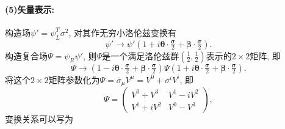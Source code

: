 \paragraph*{(5)矢量表示: }
构造场$\psi'=\psi^T_L \sigma^2$, 对其作无穷小洛伦兹变换有
\begin{equation}
  \psi' \rightarrow \psi'(1 + i\bm{\theta}\cdot\tfrac{\bm{\sigma}}{2} + \bm{\beta}\cdot\tfrac{\bm{\sigma}}{2}).
\end{equation}
构造复合场$\Psi = \psi_R \psi'$, 则$\Psi$是一个满足洛伦兹群$(\frac{1}{2}, \frac{1}{2})$表示的$2\times 2$矩阵, 即
\begin{equation}
  \Psi \rightarrow (1 - i\bm{\theta}\cdot\tfrac{\bm{\sigma}}{2} + \bm{\beta}\cdot\tfrac{\bm{\sigma}}{2}) \Psi (1 + i\bm{\theta}\cdot\tfrac{\bm{\sigma}}{2} + \bm{\beta}\cdot\tfrac{\bm{\sigma}}{2}).
\end{equation}
将这个$2\times 2$矩阵参数化为$\Psi = \bar{\sigma}_{\mu}V^{\mu} = V^0 + \sigma^i V^i$, 即
\begin{equation}
  \Psi = \begin{pmatrix}
    V^0+V^3  & V^1-iV^2 \\
    V^1+iV^2 & V^0-V^3
  \end{pmatrix},
\end{equation}
变换关系可以写为

